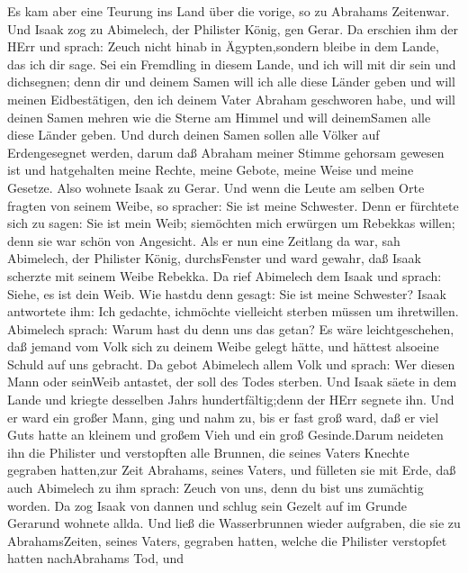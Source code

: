  Es kam aber eine Teurung ins Land über die vorige, so zu
Abrahams Zeitenwar. Und Isaak zog zu Abimelech, der Philister König, gen
Gerar.  Da erschien ihm der HErr und sprach: Zeuch nicht
hinab in Ägypten,sondern bleibe in dem Lande, das ich dir sage.
 Sei ein Fremdling in diesem Lande, und ich will mit dir
sein und dichsegnen; denn dir und deinem Samen will ich alle diese
Länder geben und will meinen Eidbestätigen, den ich deinem Vater Abraham
geschworen habe,  und will deinen Samen mehren wie die
Sterne am Himmel und will deinemSamen alle diese Länder geben. Und durch
deinen Samen sollen alle Völker auf Erdengesegnet werden, 
darum daß Abraham meiner Stimme gehorsam gewesen ist und hatgehalten
meine Rechte, meine Gebote, meine Weise und meine Gesetze. 
Also wohnete Isaak zu Gerar.  Und wenn die Leute am selben
Orte fragten von seinem Weibe, so spracher: Sie ist meine Schwester.
Denn er fürchtete sich zu sagen: Sie ist mein Weib; siemöchten mich
erwürgen um Rebekkas willen; denn sie war schön von Angesicht.
 Als er nun eine Zeitlang da war, sah Abimelech, der
Philister König, durchsFenster und ward gewahr, daß Isaak scherzte mit
seinem Weibe Rebekka.  Da rief Abimelech dem Isaak und
sprach: Siehe, es ist dein Weib. Wie hastdu denn gesagt: Sie ist meine
Schwester? Isaak antwortete ihm: Ich gedachte, ichmöchte vielleicht
sterben müssen um ihretwillen.  Abimelech sprach: Warum
hast du denn uns das getan? Es wäre leichtgeschehen, daß jemand vom Volk
sich zu deinem Weibe gelegt hätte, und hättest alsoeine Schuld auf uns
gebracht.  Da gebot Abimelech allem Volk und sprach: Wer
diesen Mann oder seinWeib antastet, der soll des Todes sterben.
 Und Isaak säete in dem Lande und kriegte desselben Jahrs
hundertfältig;denn der HErr segnete ihn.  Und er ward ein
großer Mann, ging und nahm zu, bis er fast groß ward,  daß
er viel Guts hatte an kleinem und großem Vieh und ein groß Gesinde.Darum
neideten ihn die Philister  und verstopften alle Brunnen,
die seines Vaters Knechte gegraben hatten,zur Zeit Abrahams, seines
Vaters, und fülleten sie mit Erde,  daß auch Abimelech zu
ihm sprach: Zeuch von uns, denn du bist uns zumächtig worden.
 Da zog Isaak von dannen und schlug sein Gezelt auf im
Grunde Gerarund wohnete allda.  Und ließ die Wasserbrunnen
wieder aufgraben, die sie zu AbrahamsZeiten, seines Vaters, gegraben
hatten, welche die Philister verstopfet hatten nachAbrahams Tod, und
